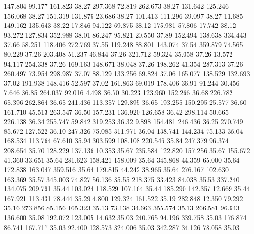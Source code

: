  147.804   99.177  161.823        38.27
 297.368   72.819  262.673        38.27
 131.642  125.246  156.068        38.27
 151.319  131.876   23.686        38.27
 101.413  111.296   39.097        38.27
  11.685  149.162  135.643        38.22
  17.846   94.122   69.875        38.12
 175.981   57.806   17.742        38.12
  93.272  127.834  352.988        38.01
  86.247   95.821   20.550        37.89
 152.494  138.638  334.443        37.66
  58.251  118.406  272.769        37.55
 119.248   88.801  143.074        37.54
 359.879   74.565   80.229        37.26
 203.408   51.237   46.844        37.26
 321.712   59.324   35.058        37.26
  13.572   94.117  254.338        37.26
 169.163  148.671   38.048        37.26
 198.262   41.354  287.313        37.26
 260.497   73.954  298.987        37.07
  88.129  133.256   69.824        37.06
 165.077  138.529  132.693        37.02
 191.938  148.416   52.597        37.02
 161.863   69.019  178.406        36.91
  91.244   30.456    7.646        36.85
 264.037   92.016    4.498        36.70
  30.223  123.960  152.266        36.68
 226.782   65.396  262.864        36.65
 241.436  113.357  129.895        36.65
 193.255  150.295   25.577        36.60
 161.710   45.513  263.547        36.50
 157.231  136.920  126.658        36.42
 298.114   50.665  226.138        36.34
 255.747   59.842  319.253        36.32
   9.898  154.481  246.436        36.25
 270.749   85.672  127.522        36.10
 247.326   75.085  311.971        36.04
 138.741  144.234   75.133        36.04
 168.534  113.764   67.610        35.94
 303.599  108.108  220.546        35.84
 247.379   96.374  208.654        35.70
 128.229  137.136   10.353        35.67
 235.584  122.820  157.256        35.67
 155.672   41.360   33.651        35.64
 281.623  158.421  158.009        35.64
 345.868   44.359   65.000        35.64
 172.838  163.047  359.516        35.64
 179.815   44.242   38.965        35.64
 276.167  102.630  163.369        35.57
 345.003   74.827   56.136        35.55
 218.375   33.423   84.038        35.53
 337.240  134.075  209.791        35.44
 103.024  118.529  107.164        35.44
 185.290  142.357   12.669        35.44
 167.921  113.431   78.444        35.29
   4.800  129.324  161.522        35.19
 282.848   12.350   79.292        35.16
 273.856   85.156  165.323        35.13
  73.138   34.663  355.574        35.13
 266.581   96.643  136.600        35.08
 192.072  123.005   14.632        35.03
 240.765   94.196  339.758        35.03
 176.874   86.741  167.717        35.03
  92.400  128.573  324.006        35.03
 342.287   34.126   78.058        35.03
